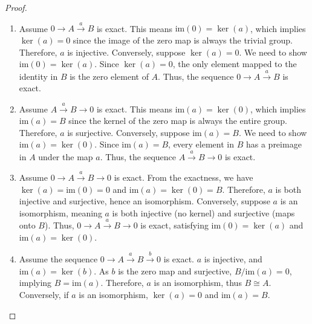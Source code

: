\begin{proof}\noindent
	\begin{enumerate}
		\item Assume \( 0 \rightarrow A \xrightarrow{a} B \) is exact. This means \(\mathrm{im}(0) = \ker(a)\), which implies \(\ker(a) = 0\) since the image of the zero map is always the trivial group. Therefore, \(a\) is injective. Conversely, suppose \(\ker(a) = 0\). We need to show \(\mathrm{im}(0) = \ker(a)\). Since \(\ker(a) = 0\), the only element mapped to the identity in \(B\) is the zero element of \(A\). Thus, the sequence \(0 \rightarrow A \xrightarrow{a} B\) is exact.
		\item Assume \( A \xrightarrow{a} B \rightarrow 0 \) is exact. This means \(\mathrm{im}(a) = \ker(0)\), which implies \(\mathrm{im}(a) = B\) since the kernel of the zero map is always the entire group. Therefore, \(a\) is surjective. Conversely, suppose \(\mathrm{im}(a) = B\). We need to show \(\mathrm{im}(a) = \ker(0)\). Since \(\mathrm{im}(a) = B\), every element in \(B\) has a preimage in \(A\) under the map \(a\). Thus, the sequence \( A \xrightarrow{a} B \rightarrow 0 \) is exact.
		\item Assume \( 0 \rightarrow A \xrightarrow{a} B \rightarrow 0 \) is exact. From the exactness, we have \(\ker(a) = \mathrm{im}(0) = 0\) and \(\mathrm{im}(a) = \ker(0) = B\). Therefore, \(a\) is both injective and surjective, hence an isomorphism. Conversely, suppose \(a\) is an isomorphism, meaning \(a\) is both injective (no kernel) and surjective (maps onto \(B\)). Thus, \( 0 \rightarrow A \xrightarrow{a} B \rightarrow 0 \) is exact, satisfying \(\mathrm{im}(0) = \ker(a)\) and \(\mathrm{im}(a) = \ker(0)\).    		      		      
		\item Assume the sequence \( 0 \rightarrow A \xrightarrow{a} B \xrightarrow{b} 0 \) is exact. \(a\) is injective, and \(\mathrm{im}(a) = \ker(b)\). As \(b\) is the zero map and surjective, \( B/\mathrm{im}(a) = 0 \), implying \( B = \mathrm{im}(a) \). Therefore, \(a\) is an isomorphism, thus \( B \cong A \). Conversely, if \(a\) is an isomorphism, \(\ker(a) = 0\) and \(\mathrm{im}(a) = B\).
	\end{enumerate}
\end{proof}


